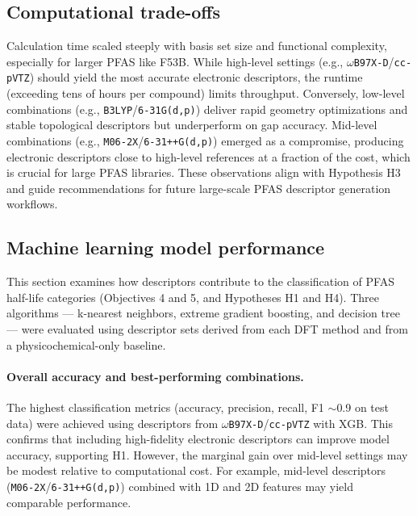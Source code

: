 \subsection{Computational trade-offs}

Calculation time scaled steeply with basis set size and functional complexity, especially for larger PFAS like F53B. While high-level settings (e.g., \texttt{\(\omega\)B97X-D}/\texttt{cc-pVTZ}) should yield the most accurate electronic descriptors, the runtime (exceeding tens of hours per compound) limits throughput. Conversely, low-level combinations (e.g., \texttt{B3LYP}/\texttt{6-31G(d,p)}) deliver rapid geometry optimizations and stable topological descriptors but underperform on gap accuracy. Mid-level combinations (e.g., \texttt{M06-2X}/\texttt{6-31++G(d,p)}) emerged as a compromise, producing electronic descriptors close to high-level references at a fraction of the cost, which is crucial for large PFAS libraries. These observations align with Hypothesis H3 and guide recommendations for future large-scale PFAS descriptor generation workflows.

\subsection{Machine learning model performance}

This section examines how descriptors contribute to the classification of PFAS half-life categories (Objectives 4 and 5, and Hypotheses H1 and H4). Three algorithms — k-nearest neighbors, extreme gradient boosting, and decision tree — were evaluated using descriptor sets derived from each DFT method and from a physicochemical-only baseline.

\paragraph{Overall accuracy and best-performing combinations.} The highest classification metrics (accuracy, precision, recall, F1 $\sim$0.9 on test data) were achieved using descriptors from \texttt{\(\omega\)B97X-D}/\texttt{cc-pVTZ} with XGB. This confirms that including high-fidelity electronic descriptors can improve model accuracy, supporting H1. However, the marginal gain over mid-level settings may be modest relative to computational cost. For example, mid-level descriptors (\texttt{M06-2X}/\texttt{6-31++G(d,p)}) combined with 1D and 2D features may yield comparable performance.

\clearpage

